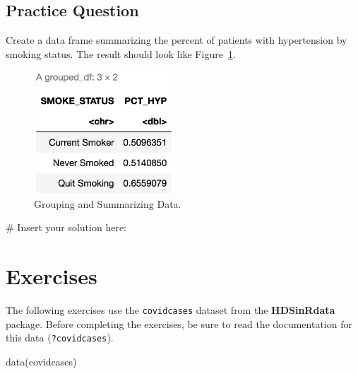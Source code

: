 \documentclass[
  letterpaper,
]{krantz}
\makeatletter
\newenvironment{Shaded}{\begin{snugshade}}{\end{snugshade}}
\newcommand{\CommentTok}[1]{\textcolor[rgb]{0.37,0.37,0.37}{#1}}
\newcommand{\FunctionTok}[1]{\textcolor[rgb]{0.28,0.35,0.67}{#1}}
\newcommand{\NormalTok}[1]{\textcolor[rgb]{0.00,0.23,0.31}{#1}}
\newenvironment{kframe}{%
\medskip{}
\setlength{\fboxsep}{.8em}
 \def\at@end@of@kframe{}%
 \ifinner\ifhmode%
  \def\at@end@of@kframe{\end{minipage}}%
  \begin{minipage}{\columnwidth}%
 \fi\fi%
 \def\FrameCommand##1{\hskip\@totalleftmargin \hskip-\fboxsep
 \colorbox{shadecolor}{##1}\hskip-\fboxsep
     \hskip-\linewidth \hskip-\@totalleftmargin \hskip\columnwidth}%
 \MakeFramed {\advance\hsize-\width
   \@totalleftmargin\z@ \linewidth\hsize
   \@setminipage}}%
 {\par\unskip\endMakeFramed%
 \at@end@of@kframe}
\renewenvironment{Shaded}{\begin{kframe}}{\end{kframe}}
\makeatother
\begin{document}
\hypertarget{practice-question-10}{%
\subsection{Practice Question}\label{practice-question-10}}

Create a data frame summarizing the percent of patients with
hypertension by smoking status. The result should look like
Figure~\ref{fig-pq3}.

\begin{figure}

{\centering \includegraphics[width=2.08333in,height=\textheight]{book/images/5-practicequestion3answer.png}

}

\caption{\label{fig-pq3}Grouping and Summarizing Data.}

\end{figure}

\begin{Shaded}
\begin{Highlighting}[]
\CommentTok{\# Insert your solution here:}
\end{Highlighting}
\end{Shaded}

\hypertarget{exercises-3}{%
\section{Exercises}\label{exercises-3}}

The following exercises use the \texttt{covidcases} dataset from the
\textbf{HDSinRdata} package. Before completing the exercises, be sure to
read the documentation for this data (\texttt{?covidcases}).

\begin{Shaded}
\begin{Highlighting}[]
\FunctionTok{data}\NormalTok{(covidcases)}
\end{Highlighting}
\end{Shaded}
\end{document}

